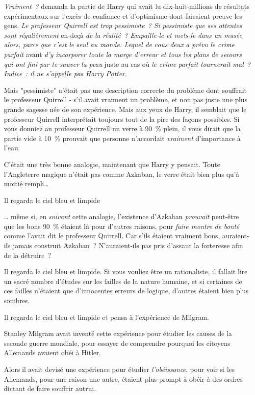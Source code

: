 \emph{Vraiment~?} demanda la partie de Harry qui avait lu dix-huit-millions de résultats expérimentaux sur l'excès de confiance et d'optimisme dont faisaient preuve les gens. \emph{Le professeur Quirrell est trop pessimiste~? Si pessimiste que ses attentes sont régulièrement} en-deçà \emph{de la réalité~? Empaille-le et mets-le dans un musée alors, parce que c'est le seul au monde. Lequel de vous deux a prévu le crime parfait} avant \emph{d'y incorporer toute la marge d'erreur et tous les plans de secours qui ont fini par te sauver la peau} juste au cas où \emph{le crime parfait tournerait mal~? Indice~: il ne s'appelle pas Harry Potter.}

Mais "pessimiste" n'était pas une description correcte du problème dont souffrait le professeur Quirrell - s'il avait vraiment un problème, et non pas juste une plus grande sagesse née de son expérience. Mais aux yeux de Harry, il semblait que le professeur Quirrell interprétait toujours tout de la pire des façons possibles. Si vous donniez au professeur Quirrell un verre à 90~\% plein, il vous dirait que la partie vide à 10~\% prouvait que personne n'accordait \emph{vraiment} d'importance à l'eau.

C'était une très bonne analogie, maintenant que Harry y pensait. Toute l'Angleterre magique n'était pas comme Azkaban, le verre était bien plus qu'à moitié rempli…

Il regarda le ciel bleu et limpide

… même si, en \emph{suivant} cette analogie, l'existence d'Azkaban \emph{prouvait} peut-être que les bons 90~\% étaient là pour d'autres raisons, pour \emph{faire montre de bonté} comme l'avait dit le professeur Quirrell. Car s'ils étaient vraiment bons, auraient-ils jamais construit Azkaban~? N'auraient-ils pas pris d'assaut la forteresse afin de la détruire~?

Il regarda le ciel bleu et limpide. Si vous vouliez être un rationaliste, il fallait lire un sacré nombre d'études sur les failles de la nature humaine, et si certaines de ces failles n'étaient que d'innocentes erreurs de logique, d'autres étaient bien plus sombres.

Il regarda le ciel bleu et limpide et pensa à l'expérience de Milgram.

Stanley Milgram avait inventé cette expérience pour étudier les causes de la seconde guerre mondiale, pour essayer de comprendre pourquoi les citoyens Allemands avaient obéi à Hitler.

Alors il avait devisé une expérience pour étudier \emph{l'obéissance}, pour voir si les Allemands, pour une raison une autre, étaient plus prompt à obéir à des ordres dictant de faire souffrir autrui.

